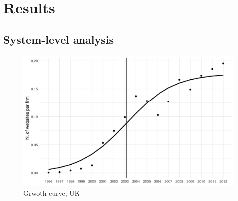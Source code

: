 \documentclass[
  authoryear,
  preprint,
  3p]{elsarticle}
\begin{document}
\section{Results}\label{sec-results}

\subsection{System-level analysis}\label{system-level-analysis}

\begin{figure}[H]

{\centering \includegraphics[width=1\textwidth,height=\textheight]{../../outputs/s/s_uk_per_firm.png}

}

\caption{\label{s_uk}Grwoth curve, UK}

\end{figure}%
\end{document}
